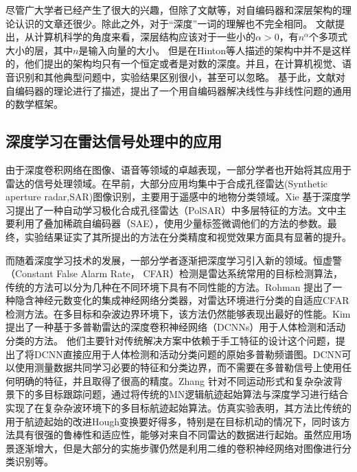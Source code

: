 尽管广大学者已经产生了很大的兴趣，但除了文献\cite{montufar2011refinements,sutskever2008deep,baldi1989neural}等，对自编码器和深层架构的理论认识的文章还很少。除此之外，对于“深度”一词的理解也不完全相同。
文献\cite{clote2013boolean}提出，从计算机科学的角度来看，深层结构应该对于一些小的$\alpha> 0$，有$n^\alpha$个多项式大小的层，其中$n$是输入向量的大小。
但是在Hinton等人描述的架构中并不是这样的，他们提出的架构均只有一个恒定或者是对数的深度。并且，在计算机视觉、语音识别和其他典型问题中，实验结果区别很小，甚至可以忽略。
基于此，文献\cite{baldi2012autoencoders}对自编码器的理论进行了描述，提出了一个用自编码器解决线性与非线性问题的通用的数学框架。

\subsection{深度学习在雷达信号处理中的应用}

由于深度卷积网络在图像、语音等领域的卓越表现，一部分学者也开始将其应用于雷达的信号处理领域。在早前，大部分应用均集中于合成孔径雷达(Synthetic aperture radar,SAR)图像识别，主要用于遥感中的地物分类领域。Xie 基于深度学习提出了一种自动学习极化合成孔径雷达（PolSAR）中多层特征的方法。文中主要利用了叠加稀疏自编码器（SAE），使用少量标签微调他们的方法的参数。最终，实验结果证实了其所提出的方法在分类精度和视觉效果方面具有显著的提升。

而随着深度学习技术的发展，一部分学者逐渐把深度学习引入新的领域。恒虚警 （Constant False Alarm Rate， CFAR）检测是雷达系统常用的目标检测算法，传统的方法可以分为几种在不同环境下具有不同性能的方法。Rohman 提出了一种隐含神经元数变化的集成神经网络分类器，对雷达环境进行分类的自适应CFAR检测方法。在多目标和杂波边界环境下，该方法仍然能够表现出最好的性能。Kim提出了一种基于多普勒雷达的深度卷积神经网络（DCNNs）用于人体检测和活动分类的方法。 他们主要针对传统解决方案中依赖于手工特征的设计这个问题，提出了将DCNN直接应用于人体检测和活动分类问题的原始多普勒频谱图。DCNN可以使用测量数据共同学习必要的特征和分类边界，而不需要在多普勒信号上使用任何明确的特征，并且取得了很高的精度。Zhang 针对不同运动形式和复杂杂波背景下的多目标跟踪问题，通过将传统的MN逻辑航迹起始算法与深度学习进行结合实现了在复杂杂波环境下的多目标航迹起始算法。仿真实验表明，其方法比传统的用于航迹起始的改进Hough变换要好得多，特别是在目标机动的情况下，同时该方法具有很强的鲁棒性和适应性，能够对来自不同雷达的数据进行起始。虽然应用场景逐渐增大，但是大部分的实施步骤仍然是利用二维的卷积神经网络对图像进行分类识别等。

